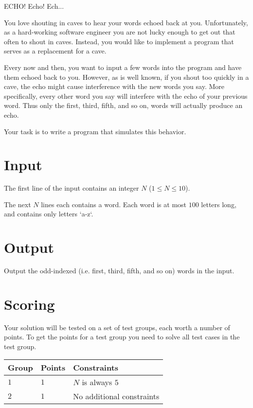 ECHO! Echo! Ech...

You love shouting in caves to hear your words echoed back at you.
Unfortunately, as a hard-working software engineer you are not lucky enough to get out that often to shout in caves.
Instead, you would like to implement a program that serves as a replacement for a cave.

Every now and then, you want to input a few words into the program and have them echoed back to you.
However, as is well known, if you shout too quickly in a cave, the echo might cause interference with the new words you say.
More specifically, every other word you say will interfere with the echo of your previous word.
Thus only the first, third, fifth, and so on, words will actually produce an echo.

Your task is to write a program that simulates this behavior.

\section*{Input}
The first line of the input contains an integer \(N\) (\(1 \le N \le 10\)).

The next \(N\) lines each contains a word.
Each word is at most \(100\) letters long, and contains only letters `a-z`.

\section*{Output}
Output the odd-indexed (i.e. first, third, fifth, and so on) words in the input.

\section*{Scoring}
Your solution will be tested on a set of test groups, each worth a number of points.
To get the points for a test group you need to solve all test cases in the test group.

\noindent
\begin{tabular}{| l | l | l |}
  \hline
  Group & Points & Constraints \\ \hline
  $1$    & $1$         &  $N$ is always $5$ \\ \hline
  $2$    & $1$        &  No additional constraints \\ \hline
\end{tabular}
